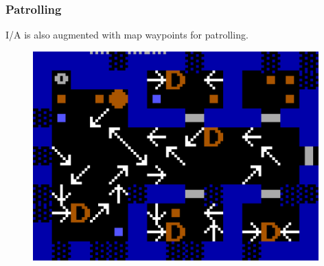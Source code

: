 \subsubsection{Patrolling}
I/A is also augmented with map waypoints for patrolling.\\
\par
{}
\par
\begin{figure}[H]
 \centering
 \includegraphics[width=0.98\textwidth]{imgs/drawings/path.png}
\end{figure}
\par







